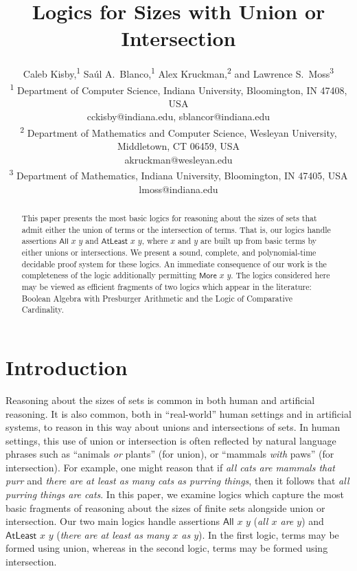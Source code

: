 \documentclass[letterpaper]{article}
\title{Logics for Sizes with Union or Intersection}
\author{Caleb Kisby,\textsuperscript{\rm 1} 
Sa\'ul A.~Blanco,\textsuperscript{\rm 1} 
Alex Kruckman,\textsuperscript{\rm 2} and 
Lawrence S.~Moss\textsuperscript{\rm 3}\\ 
\textsuperscript{1}
Department of Computer Science, Indiana University, Bloomington, IN 47408, USA \\
cckisby@indiana.edu, sblancor@indiana.edu \\
\textsuperscript{2}
Department of Mathematics and Computer Science, Wesleyan University, Middletown, CT 06459,  USA\\
akruckman@wesleyan.edu \\
\textsuperscript{3}
Department of Mathematics, Indiana University, Bloomington, IN 47405, USA \\
lmoss@indiana.edu \\
}
\theoremstyle{definition}
\newcommand{\All}[2]{\mathsf{All}\,\,#1\,\,#2}
\newcommand{\Atleast}[2]{\mathsf{AtLeast}\,\,#1\,\,#2}
\newcommand{\More}[2]{\mathsf{More}\,\,#1\,\,#2}
\begin{document}
\maketitle


\begin{abstract}
    This paper presents the most basic logics for reasoning about the sizes of sets that admit either the union of terms or the intersection of terms.  That is, our logics handle assertions $\All{x}{y}$ and $\Atleast{x}{y}$, where $x$ and $y$ are built up from basic terms by either unions or intersections.  We present a sound, complete, and polynomial-time decidable proof system for these logics. 
    An immediate consequence of our work is the completeness of the logic additionally permitting $\More{x}{y}$.  The logics considered here may be viewed as efficient fragments of two logics which appear in the literature:  Boolean Algebra with Presburger Arithmetic and the Logic of Comparative Cardinality.
\end{abstract}

\tableofcontents

\section{Introduction}

Reasoning about the sizes of sets is common in both human and artificial reasoning.  It is also common, both in ``real-world'' human settings and in artificial systems, to reason in this way about unions and intersections of sets. In human settings, this use of union or intersection is often reflected by natural language phrases such as ``animals \emph{or} plants'' (for union), or ``mammals \emph{with} paws'' (for intersection).  For example, one might reason that if \emph{all cats are mammals that purr} and \emph{there are at least as many cats as purring things}, then it follows that \emph{all purring things are cats}.
In this paper, we examine logics which capture the most basic fragments of reasoning about the sizes of finite sets alongside union or intersection.  Our two main logics handle assertions $\All{x}{y}$ (\emph{all $x$ are $y$}) and $\Atleast{x}{y}$ (\emph{there are at least as many $x$ as $y$}).  In the first logic, terms may be formed using union, whereas in the second logic, terms may be formed using intersection.
\end{document}
